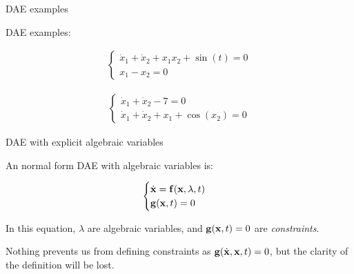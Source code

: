 \documentclass{beamer}
\begin{document}
\begin{frame}{DAE examples}
	\begin{flushleft}
		
		DAE examples:
		
		\begin{align}
		\begin{cases}
						\dot x_1 + \dot x_2 + x_1 x_2 +  \sin(t) = 0\\
						x_1 - x_2 = 0
		\end{cases}
		\end{align}
		
		\begin{align}
			\begin{cases}
				\dot x_1 + \dot x_2 - 7 = 0\\
				\dot x_1 + \dot x_2 + x_1 + \cos(x_2) = 0
			\end{cases}
		\end{align}
		
		
	\end{flushleft}
\end{frame}



\begin{frame}{DAE with explicit algebraic variables}
	\begin{flushleft}
		
		An normal form DAE with algebraic variables is:
		
		\begin{equation}
			\begin{cases}
				\dot{\mathbf{x}} = \mathbf{f}(\mathbf{x}, \lambda, t) \\
				\mathbf{g}(\mathbf{x}, t) = 0
			\end{cases}
		\end{equation}
	
		In this equation, $\lambda$ are algebraic variables, and $\mathbf{g}(\mathbf{x}, t) = 0$ are \emph{constraints}.
		
		\bigskip
		
		\textcolor{mygrey}{
		Nothing prevents us from defining constraints as $\mathbf{g}(\dot{\mathbf{x}}, \mathbf{x}, t) = 0$, but the clarity of the definition will be lost.
		}

	\end{flushleft}
\end{frame}
\end{document}
